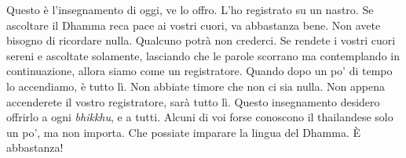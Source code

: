 Questo è l'insegnamento di oggi, ve lo offro. L'ho registrato su un
nastro. Se ascoltare il Dhamma reca pace ai vostri cuori, va abbastanza
bene. Non avete bisogno di ricordare nulla. Qualcuno potrà non crederci.
Se rendete i vostri cuori sereni e ascoltate solamente, lasciando che le
parole scorrano ma contemplando in continuazione, allora siamo come un
registratore. Quando dopo un po' di tempo lo accendiamo, è tutto lì. Non
abbiate timore che non ci sia nulla. Non appena accenderete il vostro
registratore, sarà tutto lì. Questo insegnamento desidero offrirlo a
ogni \emph{bhikkhu}, e a tutti. Alcuni di voi forse conoscono il
thailandese solo un po', ma non importa. Che possiate imparare la lingua
del Dhamma. È abbastanza!

